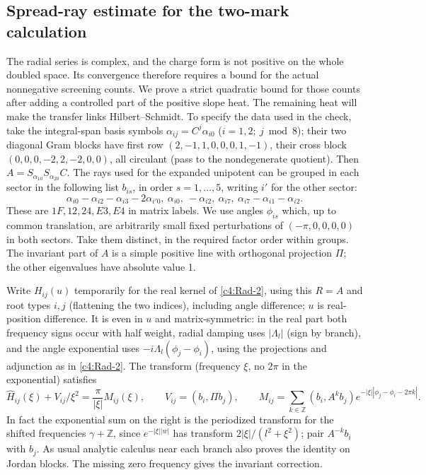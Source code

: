 \subsection{Spread-ray estimate for the two-mark calculation}\label{c4:spread}

The radial series is complex, and the charge form is not positive on
the whole doubled space.  Its convergence therefore requires a bound for
the actual nonnegative screening counts.  We prove a strict quadratic
bound for those counts after adding a controlled part of the positive
slope heat.  The remaining heat will make the transfer links
Hilbert--Schmidt. To specify the data used in the check, take the integral-span basis symbols \(\alpha_{ij}=C^j\alpha_{i0}\) (\(i=1,2;\ j\bmod8\)); their two diagonal Gram blocks have first row \((2,-1,1,0,0,0,1,-1)\), their cross block \((0,0,0,-2,2,-2,0,0)\), all circulant (pass to the nondegenerate quotient). Then \(A=S_{\alpha_{10}}S_{\alpha_{20}}C\). The rays used for the expanded unipotent can be grouped in each sector in the following list \(b_{is}\), in order \(s=1,\dots,5\), writing \(i'\) for the other sector:
\[
 \alpha_{i0}-\alpha_{i2}-\alpha_{i3}-2\alpha_{i'0},\
 \alpha_{i0},\ -\alpha_{i2},\ \alpha_{i7},\
 \alpha_{i7}-\alpha_{i1}-\alpha_{i2}.
\]
These are \(1F,12,24,E3,E4\) in matrix labels. We use angles \(\phi_{is}\) which, up to common translation, are arbitrarily small fixed perturbations of \((-\pi,0,0,0,0)\) in both sectors. Take them distinct, in the required factor order within groups. The invariant part of \(A\) is a simple positive line with orthogonal projection \(\Pi\); the other eigenvalues have absolute value 1.

Write \(H_{ij}(u)\) temporarily for the real kernel of \eqref{c4:Rad-2}, using this \(R=A\) and root types \(i,j\) (flattening the two indices), including angle difference; \(u\) is real-position difference. It is even in \(u\) and matrix-symmetric: in the real part both frequency signs occur with half weight, radial damping uses \(|\Lambda_l|\) (sign by branch), and the angle exponential uses \(-i\Lambda_l(\phi_j-\phi_i)\), using the projections and adjunction as in \eqref{c4:Rad-2}. The transform (frequency \(\xi\), no \(2\pi\) in the exponential) satisfies
\[
 \widehat H_{ij}(\xi)+V_{ij}/\xi^2
 =\frac{\pi}{|\xi|} M_{ij}(\xi),\qquad V_{ij}=(b_i,\Pi b_j),\qquad
 M_{ij}=\sum_{k\in\mathbb Z}(b_i,A^k b_j)e^{-|\xi||\phi_j-\phi_i-2\pi k|}.
\]
In fact the exponential sum on the right is the periodized transform for the shifted frequencies \(\gamma+\mathbb Z\), since \(e^{-|\xi||w|}\) has transform \(2|\xi|/(l^2+\xi^2)\); pair \(A^{-k}b_i\) with \(b_j\). As usual analytic calculus near each branch also proves the identity on Jordan blocks. The missing zero frequency gives the invariant correction.

